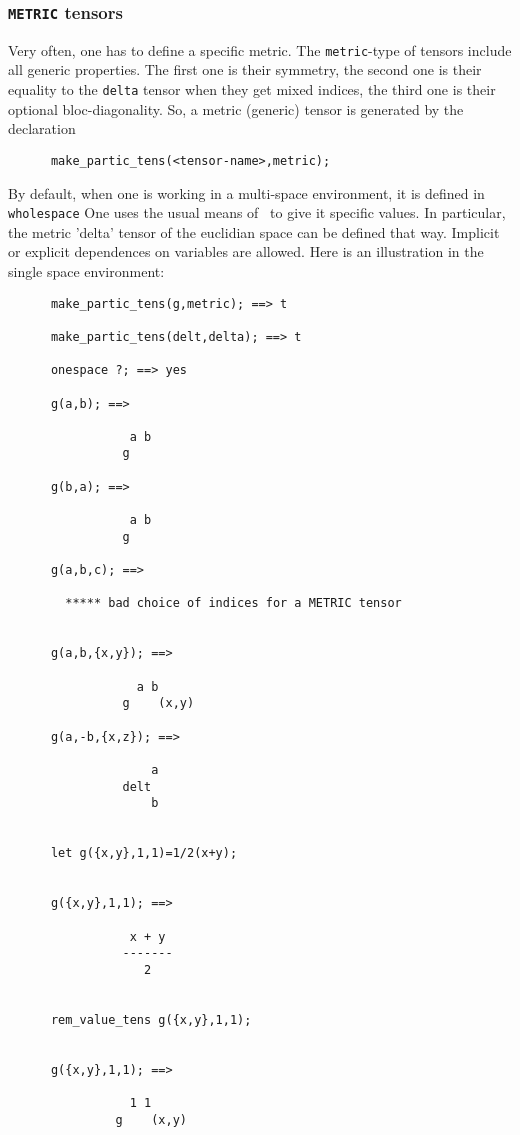 \subsubsection{\texttt{METRIC} tensors}
Very often, one has to define a specific metric. The \texttt{metric}-type 
of tensors include all generic properties. The first one is their symmetry,
the second one is their equality to the \texttt{delta}  tensor
when they get mixed indices, the third one is their optional bloc-diagonality.
So, a metric (generic) tensor is generated by the declaration 
\begin{verbatim} 
      make_partic_tens(<tensor-name>,metric);
\end{verbatim} 
By default, when one is working in a multi-space environment, it is 
defined in  \texttt{wholespace}
One uses the usual means of \REDUCE\ to give it specific values.
In particular, the metric 'delta' tensor of the euclidian space
can be defined that way.
Implicit or explicit dependences on variables are allowed.
Here is an illustration in the single space environment:
\begin{verbatim}
      make_partic_tens(g,metric); ==> t

      make_partic_tens(delt,delta); ==> t

      onespace ?; ==> yes
   
      g(a,b); ==>

                 a b
                g

      g(b,a); ==>

                 a b
                g

      g(a,b,c); ==>

        ***** bad choice of indices for a METRIC tensor


      g(a,b,{x,y}); ==>

                  a b
                g    (x,y)

      g(a,-b,{x,z}); ==>

                    a
                delt
                    b
   

      let g({x,y},1,1)=1/2(x+y);


      g({x,y},1,1); ==> 

                 x + y
                -------
                   2


      rem_value_tens g({x,y},1,1); 


      g({x,y},1,1); ==>

                 1 1
               g    (x,y)
\end{verbatim}

